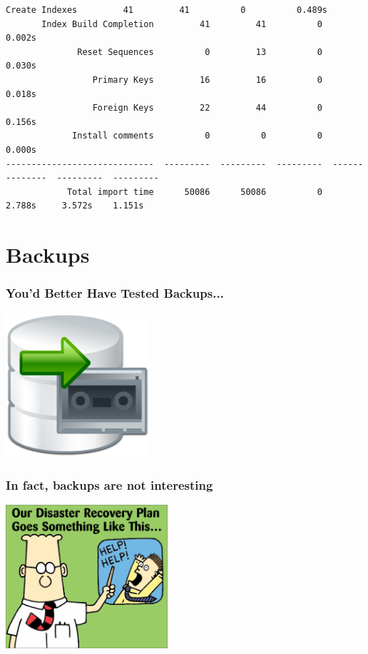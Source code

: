 \documentclass{beamer}
\begin{document}
\begin{frame}[fragile]
\begin{Verbatim}[fontsize=\tiny]
               Create Indexes         41         41          0          0.489s                     
       Index Build Completion         41         41          0          0.002s                     
              Reset Sequences          0         13          0          0.030s                     
                 Primary Keys         16         16          0          0.018s                     
                 Foreign Keys         22         44          0          0.156s                     
             Install comments          0          0          0          0.000s                     
-----------------------------  ---------  ---------  ---------  --------------  ---------  ---------
            Total import time      50086      50086          0          2.788s     3.572s    1.151s
\end{Verbatim}
\end{frame}

\section{Backups}

\begin{frame}
  \frametitle{You'd Better Have Tested Backups...}

  \begin{center}
    \includegraphics[height=2.1in]{backup-review.png}
  \end{center}
\end{frame}

\begin{frame}
  \frametitle{In fact, backups are not interesting}

  \begin{center}
    \includegraphics[height=2.1in]{our_disaster_recovery_plan.png}
  \end{center}
\end{frame}
\end{document}
